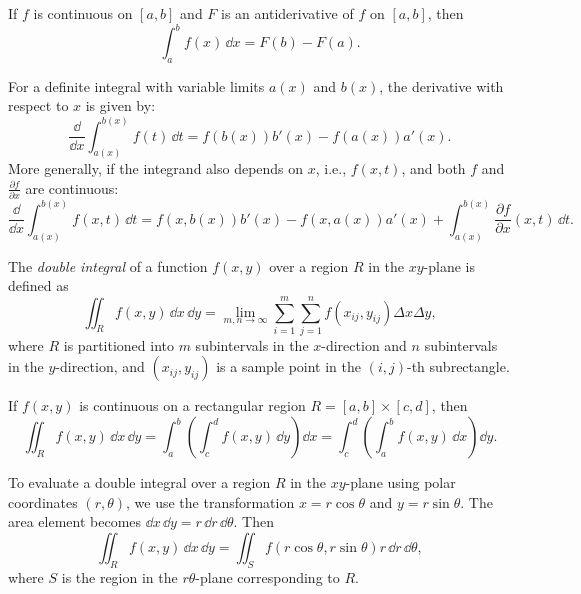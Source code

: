 \begin{theorem}
  If $f$ is continuous on $[a,b]$ and $F$ is an antiderivative of $f$ on $[a,b]$, then
  \[
    \int_a^b f(x)\,\dd x = F(b) - F(a).
  \]
\end{theorem}

\begin{theorem}
  For a definite integral with variable limits $a(x)$ and $b(x)$, the derivative with respect to $x$ is given by:
  \[
    \frac{\dd}{\dd x} \int_{a(x)}^{b(x)} f(t)\,\dd t = f(b(x)) b'(x) - f(a(x)) a'(x).
  \]
  More generally, if the integrand also depends on $x$, i.e., $f(x, t)$, and both $f$ and $\frac{\partial f}{\partial x}$ are continuous:
  \[
    \frac{\dd}{\dd x} \int_{a(x)}^{b(x)} f(x, t)\,\dd t = f(x, b(x)) b'(x) - f(x, a(x)) a'(x) + \int_{a(x)}^{b(x)} \frac{\partial f}{\partial x}(x, t)\,\dd t.
  \]
\end{theorem}

\begin{definition}
  The \emph{double integral} of a function $f(x, y)$ over a region $R$ in the $xy$-plane is defined as
  \[
    \iint_R f(x, y)\,\dd x\,\dd y = \lim_{m, n \to \infty} \sum_{i=1}^m \sum_{j=1}^n f(x_{ij}, y_{ij}) \Delta x \Delta y,
  \]
  where $R$ is partitioned into $m$ subintervals in the $x$-direction and $n$ subintervals in the $y$-direction, and $(x_{ij}, y_{ij})$ is a sample point in the $(i,j)$-th subrectangle.
\end{definition}

\begin{theorem}
  If $f(x, y)$ is continuous on a rectangular region $R = [a, b] \times [c, d]$, then
  \[
    \iint_R f(x, y)\,\dd x\,\dd y = \int_a^b \left( \int_c^d f(x, y)\,\dd y \right) \dd x = \int_c^d \left( \int_a^b f(x, y)\,\dd x \right) \dd y.
  \]
\end{theorem}

\begin{theorem}
  To evaluate a double integral over a region $R$ in the $xy$-plane using polar coordinates $(r, \theta)$, we use the transformation $x = r\cos\theta$ and $y = r\sin\theta$. The area element becomes $\dd x\,\dd y = r\,\dd r\,\dd\theta$. Then
  \[
    \iint_R f(x, y)\,\dd x\,\dd y = \iint_S f(r\cos\theta, r\sin\theta) r\,\dd r\,\dd\theta,
  \]
  where $S$ is the region in the $r\theta$-plane corresponding to $R$.
\end{theorem}

